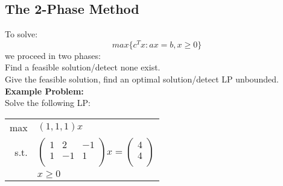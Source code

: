 \documentclass[letterpaper, 12pt]{article}
\newcommand{\blue}[1]{{\color{blue}{#1}}}
\begin{document}
    \subsection{The 2-Phase Method}
    To solve:
    $$max \{c^Tx:ax = b, x\geq 0\}$$
    we proceed in two phases:\\
    \blue{Phase 1:} Find a feasible solution/detect none exist.\\
    \blue{Phase 2:} Give the feasible solution, find an optimal solution/detect LP unbounded.
    \bigskip\\
    \textbf{Example Problem: }\\
    Solve the following LP:
    \begin{center}
        \begin{tabular}{rl}
            max & $(1,1,1)x$\\
            s.t. & $\begin{pmatrix}
                1 & 2 & -1\\
                1 & -1 & 1\\
            \end{pmatrix}x = \begin{pmatrix}
                4\\4\\
            \end{pmatrix}$\\
            & $x \geq 0$\\
        \end{tabular}
    \end{center}
\end{document}
